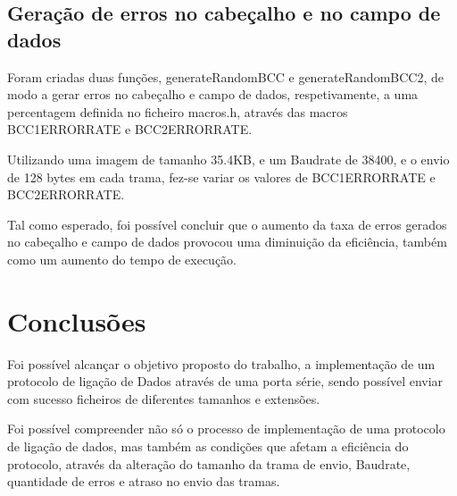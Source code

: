 \documentclass{article}
\begin{document}
\subsection{Geração de erros no cabeçalho e no campo de dados}

Foram criadas duas funções, generateRandomBCC e generateRandomBCC2, de modo a gerar erros no cabeçalho e campo de dados, respetivamente, a uma percentagem definida no ficheiro macros.h, através das macros BCC1ERRORRATE e BCC2ERRORRATE.

Utilizando uma imagem de tamanho 35.4KB, e um Baudrate de 38400, e o envio de 128 bytes em cada trama, fez-se variar os valores de BCC1ERRORRATE e BCC2ERRORRATE.

Tal como esperado, foi possível concluir que o aumento da taxa de erros gerados no cabeçalho e campo de dados provocou uma diminuição da eficiência, também como um aumento do tempo de execução.

\section{Conclusões}
Foi possível alcançar o objetivo proposto do trabalho, a implementação de um protocolo de  ligação de Dados através de uma porta série, sendo possível enviar com sucesso ficheiros de diferentes tamanhos e extensões.

Foi possível compreender não só o processo de implementação de uma protocolo de ligação de dados, mas também as condições que afetam a eficiência do protocolo, através da alteração do tamanho da trama de envio, Baudrate, quantidade de erros e atraso no envio das tramas.
\end{document}
